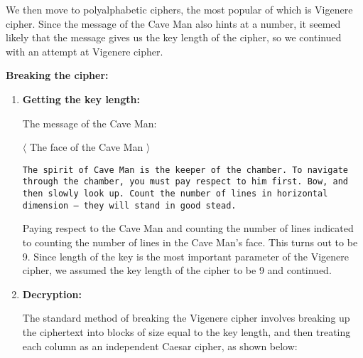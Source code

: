 \documentclass[11pt]{article}
\begin{document}
We then move to polyalphabetic ciphers, the most popular of which is Vigenere cipher. Since the message of the Cave Man also hints at a number, it seemed likely that the message gives us the key length of the cipher, so we continued with an attempt at Vigenere cipher.

\pagebreak

\textbf{Breaking the cipher: }

\begin{enumerate}
  \item \textbf{Getting the key length: }
  
  The message of the Cave Man: 
  \smallskip

  \begin{center}
    $\langle$ The face of the Cave Man $\rangle$

  \texttt{The spirit of Cave Man is the keeper of the chamber. To navigate through the chamber, you must pay respect to him first. Bow, and then slowly look up. Count the number of lines in horizontal dimension -- they will stand in good stead.}
  \end{center}

  \bigskip

  Paying respect to the Cave Man and counting the number of lines indicated to counting the number of lines in the Cave Man's face. This turns out to be 9. Since length of the key is the most important parameter of the Vigenere cipher, we assumed the key length of the cipher to be 9 and continued.

  \item \textbf{Decryption: }
  
  The standard method of breaking the Vigenere cipher involves breaking up the ciphertext into blocks of size equal to the key length, and then treating each column as an independent Caesar cipher, as shown below:
  \bigskip


\end{enumerate}
\end{document}

